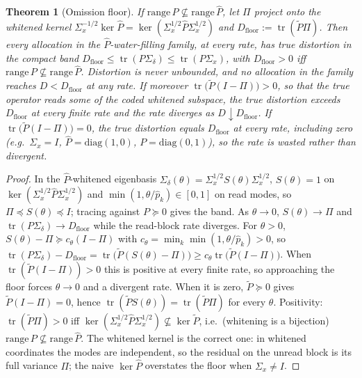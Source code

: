 \documentclass[lettersize,onecolumn]{IEEEtran}
\newtheorem{theorem}{Theorem}
\theoremstyle{definition}
\theoremstyle{remark}
\newcommand{\tr}{\operatorname{tr}}
\begin{document}
\begin{theorem}[Omission floor]\label{thm:omission}
If $\mathrm{range}\,P\not\subseteq\mathrm{range}\,\hat P$, let $\Pi$ project onto the
\emph{whitened} kernel $\Sigma_x^{-1/2}\ker\hat P=\ker(\Sigma_x^{1/2}\hat P\Sigma_x^{1/2})$
and $D_{\mathrm{floor}}:=\tr(\tilde P\Pi)$. Then every allocation in the $\hat
P$-water-filling family, at every rate, has true distortion in the compact band
$D_{\mathrm{floor}}\le\tr(P\Sigma_\delta)\le\tr(P\Sigma_x)$, with $D_{\mathrm{floor}}>0$
iff $\mathrm{range}\,P\not\subseteq\mathrm{range}\,\hat P$. Distortion is never unbounded,
and no allocation in the family reaches $D<D_{\mathrm{floor}}$ at any rate. If moreover
$\tr\big(\tilde P(I-\Pi)\big)>0$, so that the true operator reads some of the coded
whitened subspace, the true distortion exceeds $D_{\mathrm{floor}}$ at every finite rate
and the rate diverges as $D\downarrow D_{\mathrm{floor}}$. If
$\tr\big(\tilde P(I-\Pi)\big)=0$, the true distortion equals $D_{\mathrm{floor}}$ at every
rate, including zero (e.g.\ $\Sigma_x=I$, $\hat P=\mathrm{diag}(1,0)$,
$P=\mathrm{diag}(0,1)$), so the rate is wasted rather than divergent.
\end{theorem}
\begin{proof}
In the $\hat P$-whitened eigenbasis $\Sigma_\delta(\theta)=\Sigma_x^{1/2}S(\theta)
\Sigma_x^{1/2}$, $S(\theta)=1$ on $\ker(\Sigma_x^{1/2}\hat P\Sigma_x^{1/2})$ and
$\min(1,\theta/\hat p_k)\in[0,1]$ on read modes, so $\Pi\preceq S(\theta)\preceq I$;
tracing against $P\succeq0$ gives the band. As $\theta\to0$, $S(\theta)\to\Pi$ and
$\tr(P\Sigma_\delta)\to D_{\mathrm{floor}}$ while the read-block rate diverges. For
$\theta>0$, $S(\theta)-\Pi\succeq c_\theta(I-\Pi)$ with
$c_\theta=\min_k\min(1,\theta/\hat p_k)>0$, so
$\tr(P\Sigma_\delta)-D_{\mathrm{floor}}=\tr\big(\tilde P(S(\theta)-\Pi)\big)\ge
c_\theta\tr\big(\tilde P(I-\Pi)\big)$. When $\tr(\tilde P(I-\Pi))>0$ this is positive at
every finite rate, so approaching the floor forces $\theta\to0$ and a divergent rate. When
it is zero, $\tilde P\succeq0$ gives $\tilde P(I-\Pi)=0$, hence
$\tr(\tilde P S(\theta))=\tr(\tilde P\Pi)$ for every $\theta$. Positivity:
$\tr(\tilde P\Pi)>0$ iff $\ker(\Sigma_x^{1/2}\hat P\Sigma_x^{1/2})\not\subseteq\ker\tilde
P$, i.e.\ (whitening is a bijection) $\mathrm{range}\,P\not\subseteq\mathrm{range}\,\hat
P$. The whitened kernel is the correct one: in whitened coordinates the modes are
independent, so the residual on the unread block is its full variance $\Pi$; the naive
$\ker\hat P$ overstates the floor when $\Sigma_x\ne I$.
\end{proof}
\end{document}
